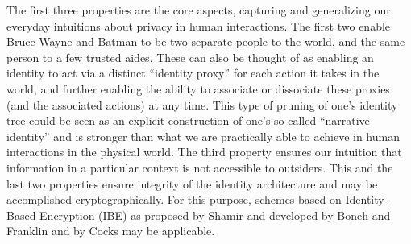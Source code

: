 \documentclass[pra,twocolumn,groupedaddress,10pt]{revtex4}
\theoremstyle{definition}
\begin{document}
The first three properties are the core aspects, capturing and generalizing our everyday intuitions about privacy in human interactions. The first two enable Bruce Wayne and Batman to be two separate people to the world, and the same person to a few trusted aides. These can also be thought of as enabling an identity to act via a distinct ``identity proxy'' for each action it takes in the world, and further enabling the ability to associate or dissociate these proxies (and the associated actions) at any time. This type of pruning of one's identity tree could be seen as an explicit construction of one's so-called ``narrative identity''\cite{narrativeidentity} and is stronger than what we are practically able to achieve in human interactions in the physical world. The third property ensures our intuition that information in a particular context is not accessible to outsiders. This and the last two properties ensure integrity of the identity architecture and may be accomplished cryptographically. For this purpose, schemes based on Identity-Based Encryption (IBE) as proposed by Shamir\cite{shamir} and developed by Boneh and Franklin\cite{boneh} and by Cocks\cite{cocks} may be applicable.
\end{document}
